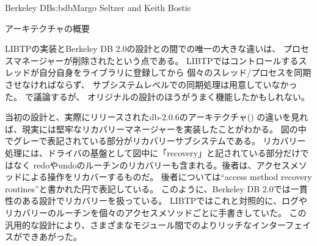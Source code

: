 \begin{aosachapter}{Berkeley DB}{s:bdb}{Margo Seltzer and Keith Bostic}
\begin{aosasect1}{アーキテクチャの概要}


LIBTPの実装とBerkeley DB 2.0の設計との間での唯一の大きな違いは、
プロセスマネージャーが削除されたという点である。
LIBTPではコントロールするスレッドが自分自身をライブラリに登録してから
個々のスレッド/プロセスを同期させなければならず、
サブシステムレベルでの同期処理は用意していなかった。
で議論するが、
オリジナルの設計のほうがうまく機能したかもしれない。


当初の設計と、実際にリリースされたdb-2.0.6のアーキテクチャ()
の違いを見れば、現実には堅牢なリカバリーマネージャーを実装したことがわかる。
図の中でグレーで表記されている部分がリカバリーサブシステムである。
リカバリー処理には、ドライバの基盤として図中に「recovery」と記されている部分だけではなく
redoやundoのルーチンのリカバリーも含まれる。後者は、アクセスメソッドによる操作をリカバーするものだ。
後者については``access method recovery routines''と書かれた円で表記している。
このように、Berkeley DB 2.0では一貫性のある設計でリカバリーを扱っている。
LIBTPではこれと対照的に、ログやリカバリーのルーチンを個々のアクセスメソッドごとに手書きしていた。
この汎用的な設計により、さまざまなモジュール間でのよりリッチなインターフェイスができあがった。


\end{aosasect1}
\end{aosachapter}
